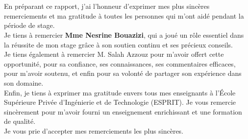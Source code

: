 \documentclass[../main.tex]{subfiles}
\begin{document}
\clearpage
\section*{}
\vspace{100pt}

En préparant ce rapport, j'ai l'honneur d'exprimer mes plus sincères remerciements et ma gratitude à toutes les personnes qui m'ont aidé pendant la période de stage.
\vspace{100pt}
\\
Je tiens à remercier \textbf{Mme Nesrine Bouazizi}, qui a joué un rôle essentiel dans la réussite de mon stage grâce à son soutien continu et ses précieux conseils.
\vspace{30pt}
\\
Je tiens également à remercier M. Salah Azzouz pour m'avoir offert cette opportunité, pour sa confiance, ses connaissances, ses commentaires efficaces, pour m'avoir soutenu, et enfin pour sa volonté de partager son expérience dans son domaine.
\vspace{100pt}
\\
Enfin, je tiens à exprimer ma gratitude envers tous mes enseignants à l'École Supérieure Privée d'Ingénierie et de Technologie (ESPRIT). Je vous remercie sincèrement pour m'avoir fourni un enseignement enrichissant et une formation de qualité.
\vspace{10pt}
\\
Je vous prie d'accepter mes remerciements les plus sincères.

\clearpage
{}
\end{document}
